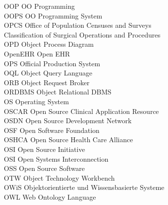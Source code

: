 \begin{tabbing}
    \>OOP \>\>OO Programming\\

    \>OOPS \>\>OO Programming System\\

    \>OPCS \>\>Office of Population Censuses and Surveys\\
        \>\>\>Classification of Surgical Operations and Procedures\\

    \>OPD \>\>Object Process Diagram\\

    \>OpenEHR \>\>Open EHR\\

    \>OPS \>\>Official Production System\\

    \>OQL \>\>Object Query Language\\

    \>ORB \>\>Object Request Broker\\

    \>ORDBMS \>\>Object Relational DBMS\\

    \>OS \>\>Operating System\\

    \>OSCAR \>\>Open Source Clinical Application Resource\\

    \>OSDN \>\>Open Source Development Network\\

    \>OSF \>\>Open Software Foundation\\

    \>OSHCA \>\>Open Source Health Care Alliance\\

    \>OSI \>\>Open Source Initiative\\

    \>OSI \>\>Open Systems Interconnection\\


    \>OSS \>\>Open Source Software\\

    \>OTW \>\>Object Technology Workbench\\

    \>OWiS \>\>Objektorientierte und Wissensbasierte Systeme\\

    \>OWL \>\>Web Ontology Language\\


\end{tabbing}
